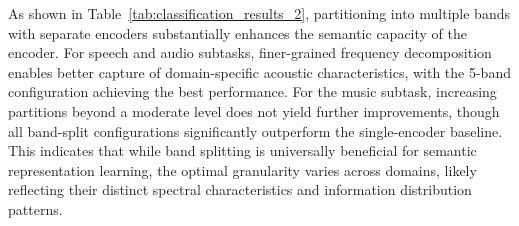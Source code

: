 \documentclass[11pt]{article}
\newcommand{\red}[1]{\textcolor{red}{#1}}
\begin{document}
As shown in Table~\ref{tab:classification_results_2}, partitioning into multiple bands with separate encoders substantially enhances the semantic capacity of the encoder. For speech and audio subtasks, finer-grained frequency decomposition enables better capture of domain-specific acoustic characteristics, with the 5-band configuration achieving the best performance. For the music subtask, increasing partitions beyond a moderate level does not yield further improvements, though all band-split configurations significantly outperform the single-encoder baseline. This indicates that while band splitting is universally beneficial for semantic representation learning, the optimal granularity varies across domains, likely reflecting their distinct spectral characteristics and information distribution patterns.
\end{document}
